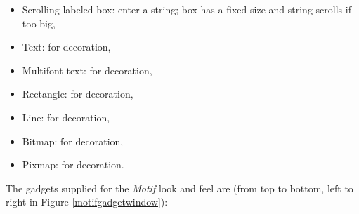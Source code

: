 \begin{itemize}
\item Scrolling-labeled-box: enter a string; box has a fixed size and string
scrolls if too big,

\item Text: for decoration,

\item Multifont-text: for decoration,

\item Rectangle: for decoration,

\item Line: for decoration,

\item Bitmap: for decoration,

\item Pixmap: for decoration.
\end{itemize}


The gadgets supplied for the {\it Motif} look and feel are (from top to
bottom, left to right in Figure \ref{motifgadgetwindow}):

